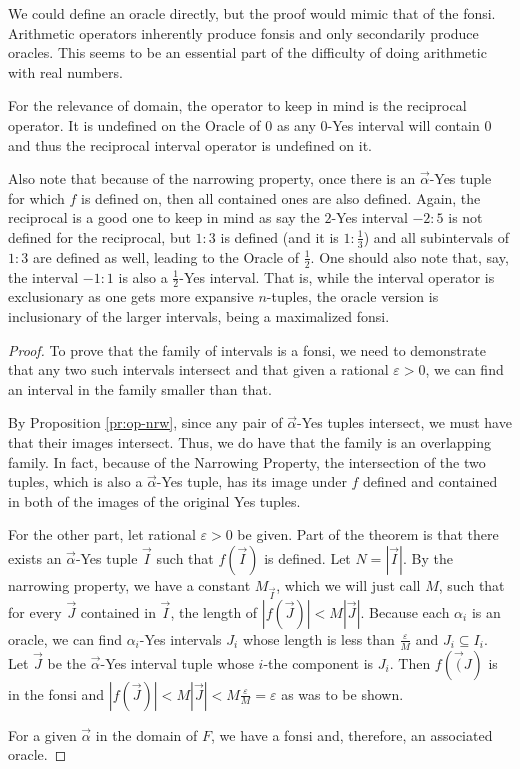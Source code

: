 \documentclass[12pt]{article}
\theoremstyle{remark}
\begin{document}
We could define an oracle directly, but the proof would mimic that of the fonsi. Arithmetic operators inherently produce fonsis and only secondarily produce oracles. This seems to be an essential part of the difficulty of doing arithmetic with real numbers. 

For the relevance of domain, the operator to keep in mind is the reciprocal operator. It is undefined on the Oracle of 0 as any 0-Yes interval will contain 0 and thus the reciprocal interval operator is undefined on it. 

Also note that because of the narrowing property, once there is an $\vec{\alpha}$-Yes tuple for which $f$ is defined on, then all contained ones are also defined. Again, the reciprocal is a good one to keep in mind as say the $2$-Yes interval $-2:5$ is not defined for the reciprocal, but $1:3$ is defined (and it is $1:\frac{1}{3}$) and all subintervals of $1:3$ are defined as well, leading to the Oracle of $\frac{1}{2}$. One should also note that, say, the interval $-1:1$ is also a $\frac{1}{2}$-Yes interval. That is, while the interval operator is exclusionary as one gets more expansive $n$-tuples, the oracle version is inclusionary of the larger intervals, being a maximalized fonsi. 

\begin{proof}
To prove that the family of intervals is a fonsi, we need to demonstrate that any two such intervals intersect and that given a rational $\varepsilon > 0$, we can find an interval in the family smaller than that. 

By Proposition \ref{pr:op-nrw}, since any pair of $\vec{\alpha}$-Yes tuples intersect, we must have that their images intersect. Thus, we do have that the family is an overlapping family. In fact, because of the Narrowing Property, the intersection of the two tuples, which is also a $\vec{\alpha}$-Yes tuple, has its image under $f$ defined and contained in both of the images of the original Yes tuples. 

For the other part, let rational $\varepsilon >0$ be given. Part of the theorem is that there exists an $\vec{\alpha}$-Yes tuple $\vec{I}$ such that $f(\vec{I})$ is defined. Let $N =|\vec{I}|$. By the narrowing property, we have a constant $M_{\vec{I}}$, which we will just call $M$, such that for every $\vec{J}$ contained in $\vec{I}$, the length of $|f(\vec{J})| < M |\vec{J}|$. Because each $\alpha_i$ is an oracle, we can find $\alpha_i$-Yes intervals $J_i$ whose length is less than $\frac{\varepsilon}{M}$ and $J_i \subseteq I_i$. Let $\vec{J}$ be the $\vec{\alpha}$-Yes interval tuple whose $i$-the component is $J_i$. Then $f(\vec({J})$ is in the fonsi and $|f(\vec{J})| < M |\vec{J}| < M \frac{\varepsilon}{M} = \varepsilon$ as was to be shown. 

For a given $\vec{\alpha}$ in the domain of $F$, we have a fonsi and, therefore, an associated oracle.
\end{proof}
\end{document}
